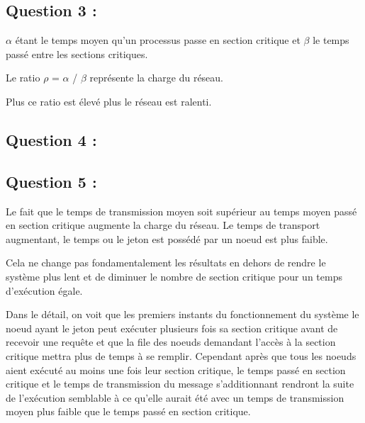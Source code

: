 \documentclass[11pt,a4paper]{report}
\begin{document}
\section{Question 3 :}

$\alpha$ étant le temps moyen qu'un processus passe en section critique et $\beta$ le temps passé entre les sections critiques.

Le ratio $\rho$ = $\alpha$ / $\beta$ représente la charge du réseau.

Plus ce ratio est élevé plus le réseau est ralenti.

\section{Question 4 :}

\section{Question 5 :}

Le fait que le temps de transmission moyen soit supérieur au temps moyen passé en section critique augmente la charge du réseau. Le temps de transport augmentant, le temps ou le jeton est possédé par un noeud est plus faible.

Cela ne change pas fondamentalement les résultats en dehors de rendre le système plus lent et de diminuer le nombre de section critique pour un temps d'exécution égale.

Dans le détail, on voit que les premiers instants du fonctionnement du système le noeud ayant le jeton peut exécuter plusieurs fois sa section critique avant de recevoir une requête et que la file des noeuds demandant l'accès à la section critique mettra plus de temps à se remplir. Cependant après que tous les noeuds aient exécuté au moins une fois leur section critique, le temps passé en section critique et le temps de transmission du message s'additionnant rendront la suite de l'exécution semblable à ce qu'elle aurait été avec un temps de transmission moyen plus faible que le temps passé en section critique.


\chapter{}


\chapter{}
\end{document}
